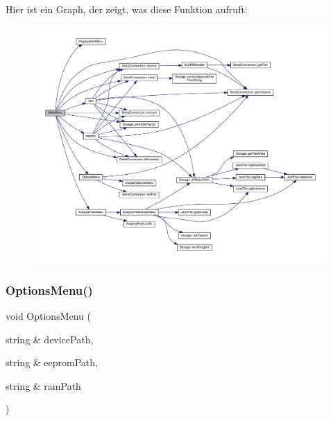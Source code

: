 Hier ist ein Graph, der zeigt, was diese Funktion aufruft\+:
\nopagebreak
\begin{figure}[H]
\begin{center}
\leavevmode
\includegraphics[width=350pt]{_jura_coffee_memory_8cpp_a738ac361f7823bd523c2b86533ed2b67_cgraph}
\end{center}
\end{figure}
\mbox{\label{_jura_coffee_memory_8cpp_ae46c8e2155f07fd7da805fc23e7778ad}} 
\subsubsection{Options\+Menu()}
{\footnotesize\ttfamily void Options\+Menu (\begin{DoxyParamCaption}\item[{string \&}]{device\+Path,  }\item[{string \&}]{eeprom\+Path,  }\item[{string \&}]{ram\+Path }\end{DoxyParamCaption})}

